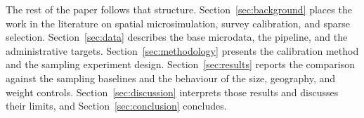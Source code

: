 The rest of the paper follows that structure. Section~\ref{sec:background} places the work in the
literature on spatial microsimulation, survey calibration, and sparse selection.
Section~\ref{sec:data} describes the base microdata, the \microcosm{} pipeline, and the
administrative targets. Section~\ref{sec:methodology} presents the calibration method and the
sampling experiment design. Section~\ref{sec:results} reports the comparison against the sampling
baselines and the behaviour of the size, geography, and weight controls. Section~\ref{sec:discussion}
interprets those results and discusses their limits, and Section~\ref{sec:conclusion} concludes.
